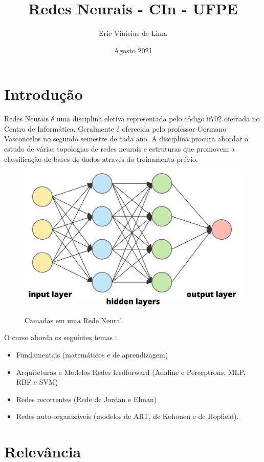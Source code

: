 \documentclass{article}
\title{Redes Neurais - CIn - UFPE}
\author{Eric Vinicius de Lima}
\date{Agosto 2021}
\begin{document}
\maketitle

\section{Introdução}

Redes Neurais é uma disciplina eletiva representada pelo código if702 ofertada no Centro de Informática. Geralmente é oferecida pelo professor Germano Vasconcelos \cite{Professor} no segundo semestre de cada ano. A disciplina procura abordar o estudo de várias topologias de redes neurais e estruturas que promovem a classificação de bases de dados através do treinamento prévio. \cite{Curso}

\begin{figure}[h]
\centering
\includegraphics[scale=0.2]{layers.jpg}
\caption{Camadas em uma Rede Neural \citep{Figura1}}
\label{figura_1}
\end{figure}

O curso aborda os seguintes temas \cite{Curso}:
\begin{itemize}
    \item Fundamentais (matemáticos e de aprendizagem) \item Arquiteturas e Modelos Redes feedforward (Adaline e Perceptrons, MLP, RBF e SVM) 
    \item Redes recorrentes (Rede de Jordan e Elman) \item Redes auto-organizáveis (modelos de ART, de Kohonen e de Hopfield).
\end{itemize}

\section{Relevância}
\end{document}
